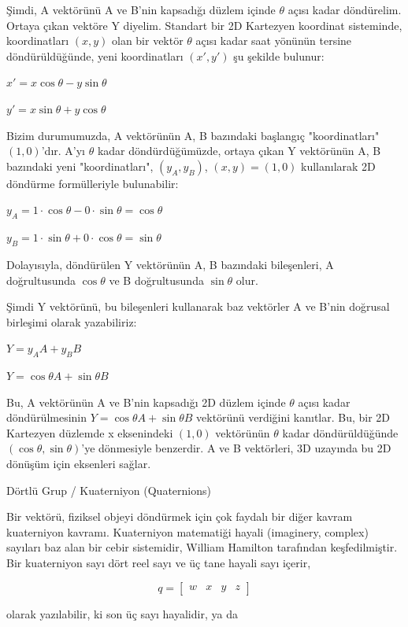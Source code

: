 \documentclass[12pt,fleqn]{article}\usepackage{../../common}
\begin{document}
Şimdi, A vektörünü A ve B'nin kapsadığı düzlem içinde $\theta$ açısı
kadar döndürelim. Ortaya çıkan vektöre Y diyelim. Standart bir 2D
Kartezyen koordinat sisteminde, koordinatları $(x, y)$ olan bir vektör
$\theta$ açısı kadar saat yönünün tersine döndürüldüğünde, yeni
koordinatları $(x', y')$ şu şekilde bulunur:

$x' = x \cos \theta - y \sin \theta$

$y' = x \sin \theta + y \cos \theta$

Bizim durumumuzda, A vektörünün {A, B} bazındaki başlangıç
"koordinatları" $(1, 0)$'dır. A'yı $\theta$ kadar döndürdüğümüzde,
ortaya çıkan Y vektörünün {A, B} bazındaki yeni "koordinatları",
$(y_A, y_B)$, $(x, y) = (1, 0)$ kullanılarak 2D döndürme formülleriyle
bulunabilir:

$y_A = 1 \cdot \cos \theta - 0 \cdot \sin \theta = \cos \theta$

$y_B = 1 \cdot \sin \theta + 0 \cdot \cos \theta = \sin \theta$

Dolayısıyla, döndürülen Y vektörünün {A, B} bazındaki bileşenleri, A
doğrultusunda $\cos \theta$ ve B doğrultusunda $\sin \theta$ olur.

Şimdi Y vektörünü, bu bileşenleri kullanarak baz vektörler A ve B'nin
doğrusal birleşimi olarak yazabiliriz:

$Y = y_A A + y_B B$

$Y = \cos \theta A + \sin \theta B$

Bu, A vektörünün A ve B'nin kapsadığı 2D düzlem içinde $\theta$ açısı
kadar döndürülmesinin $Y = \cos \theta A + \sin \theta B$ vektörünü
verdiğini kanıtlar. Bu, bir 2D Kartezyen düzlemde x eksenindeki $(1,
0)$ vektörünün $\theta$ kadar döndürüldüğünde $(\cos \theta, \sin
\theta)$'ye dönmesiyle benzerdir. A ve B vektörleri, 3D uzayında bu 2D
dönüşüm için eksenleri sağlar.

Dörtlü Grup / Kuaterniyon (Quaternions)

Bir vektörü, fiziksel objeyi döndürmek için çok faydalı bir diğer kavram
kuaterniyon kavramı.  Kuaterniyon matematiği hayali (imaginery, complex)
sayıları baz alan bir cebir sistemidir, William Hamilton tarafından
keşfedilmiştir. Bir kuaterniyon sayı dört reel sayı ve üç tane hayali sayı
içerir,

$$
q = [\begin{array}{cccc} w & x & y & z \end{array}]
$$

olarak yazılabilir, ki son üç sayı hayalidir, ya da
\end{document}
